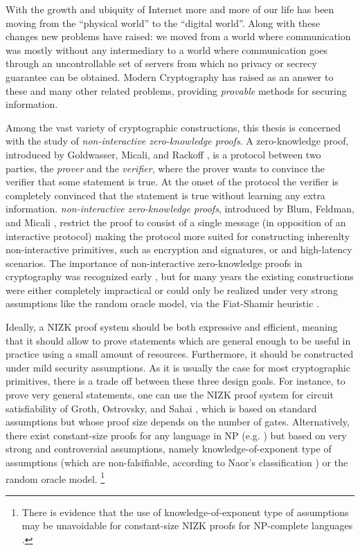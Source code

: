 With the growth and ubiquity of Internet more and more of our life has been moving from the ``physical world'' to the ``digital world''. Along with these changes new problems have raised: we moved from a world where communication was mostly without any intermediary to a world where communication goes through an uncontrollable set of servers from which no privacy or secrecy guarantee can be obtained. Modern Cryptography has raised as an answer to these and many other related problems, providing \emph{provable} methods for securing information.  

Among the vast variety of cryptographic constructions, this thesis is concerned with the study of \emph{non-interactive  zero-knowledge proofs}.
A zero-knowledge proof, introduced by Goldwasser, Micali, and Rackoff \cite{GolMicRac89}, is a protocol between two parties, the \emph{prover} and the \emph{verifier}, where the prover wants to convince the verifier that some statement is true. At the onset of the protocol the verifier is completely convinced that the statement is true without learning any extra information. \emph{non-interactive  zero-knowledge proofs}, introduced by Blum, Feldman, and Micali \cite{STOC:BluFelMic88}, restrict the proof to consist of a single message (in opposition of an interactive protocol) making the protocol more suited for constructing inherenlty non-interactive primitives, such as encryption and signatures, or and high-latency scenarios.
The importance of non-interactive zero-knowledge proofs in cryptography was recognized early \cite{STOC:NaoYun90,STOC:DolDwoNao91,CCS:BelRog93}, but for many years the existing constructions were either completely impractical or could only be realized under very strong assumptions like the random oracle model, via the Fiat-Shamir heuristic \cite{C:FiaSha86}. 

Ideally, a NIZK proof system should be both expressive and efficient, meaning that it should allow to prove
statements which are general enough to be useful in practice using a small amount of resources.
Furthermore, it should be constructed under
mild security assumptions.
As it is usually the case for most cryptographic primitives, there is a trade off between these three design goals.
For instance,
to prove very general statements, one can use the NIZK proof 
system for circuit satisfiability of Groth, Ostrovsky, and Sahai 
\cite{EC:GroOstSah06}, which is based on standard assumptions but 
whose proof size depends on the number of gates. 
Alternatively,
there exist constant-size proofs for any language in NP
  (e.g. \cite{EC:GGPR13}) but based on very strong and controversial assumptions, 
  namely knowledge-of-exponent type of assumptions 
  (which are non-falsifiable, according to Naor's classification 
  \cite{C:Naor03}) or the random oracle model. 
\footnote{There is evidence that the use of knowledge-of-exponent type of  assumptions 
may be unavoidable for constant-size NIZK proofs for NP-complete languages \cite{STOC:GenWic11}.}

